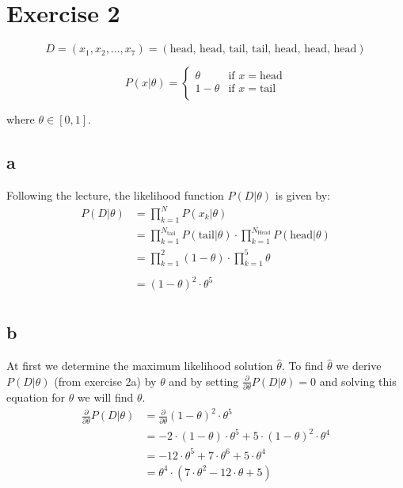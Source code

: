 \section{Exercise 2}
\begin{center}
    \begin{equation}
        D=(x_{1}, x_{2},..., x_{7})=(\textrm{head, head, tail, tail, head, head, head})
        \label{eq:sequence}
    \end{equation}
\end{center}

\begin{center}
        \[P(x|\theta)=\begin{cases}
        \theta & \text{if } x = \text{head}\\
        1-\theta& \text{if } x = \text{tail} \\
\end{cases}\]
\end{center}
where $\theta\in[0,1]$.

\subsection{a}
Following the lecture, the likelihood function $P(D|\theta)$ is given by:\\

\begin{align*}
    P(D|\theta)&=\prod_{k=1}^{N} P(x_{k}|\theta)\\
    &=\prod_{k=1}^{N_{\text{tail}}} P(\text{tail}|\theta)\cdot\prod_{k=1}^{N_{\text{Head}}} P(\text{head}|\theta)\\
    &=\prod_{k=1}^{2} (1-\theta)\cdot\prod_{k=1}^{5} \theta\\
    \\
    &=(1-\theta)^{2}\cdot\theta^{5}\\
\end{align*}

\subsection{b}
At first we determine the maximum likelihood solution $\hat{\theta}$. To find $\hat{\theta}$ we derive $P(D|\theta)$ (from exercise 2a) by $\theta$ and by setting $\frac{\partial}{\partial\theta}P(D|\theta)=0$ and solving this equation for $\theta$ we will find $\theta$.\\

\begin{align*}
    \frac{\partial}{\partial\theta} P(D|\theta) &= \frac{\partial}{\partial\theta}(1-\theta)^{2}\cdot\theta^{5}\\
    &= -2\cdot(1-\theta)\cdot\theta^{5}+5\cdot(1-\theta)^{2}\cdot\theta^{4}\\
    &= -12\cdot\theta^{5}+7\cdot\theta^{6}+5\cdot\theta^{4}\\
    &= \theta^{4}\cdot(7\cdot\theta^{2}-12\cdot\theta+5)
\end{align*}

